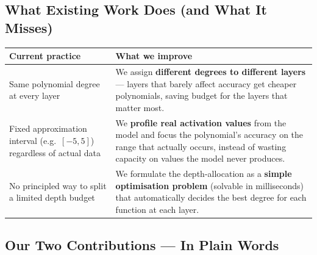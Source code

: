 \documentclass[12pt, a4paper]{article}
\begin{document}
\subsection*{What Existing Work Does (and What It Misses)}

\renewcommand{\arraystretch}{1.4}
\noindent
\begin{tabular}{@{} p{} p{} @{}}
\toprule
\textbf{Current practice} & \textbf{What we improve} \\
\midrule
Same polynomial degree at every layer &
  We assign \textbf{different degrees to different layers} — layers that barely affect accuracy get cheaper polynomials, saving budget for the layers that matter most. \\[6pt]
Fixed approximation interval (e.g.\ $[-5,5]$) regardless of actual data &
  We \textbf{profile real activation values} from the model and focus the polynomial's accuracy on the range that actually occurs, instead of wasting capacity on values the model never produces. \\[6pt]
No principled way to split a limited depth budget &
  We formulate the depth-allocation as a \textbf{simple optimisation problem} (solvable in milliseconds) that automatically decides the best degree for each function at each layer. \\
\bottomrule
\end{tabular}

\subsection*{Our Two Contributions — In Plain Words}
\end{document}
